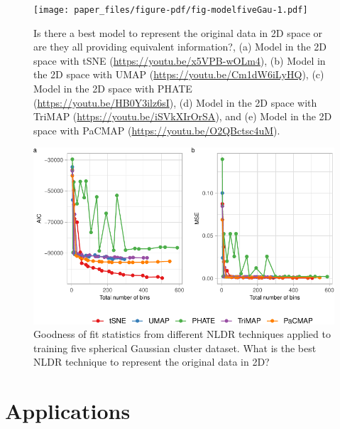 \documentclass[
  12pt]{article}
\begin{document}
\begin{figure}

{\centering \texttt{[image: paper\_files/figure-pdf/fig-modelfiveGau-1.pdf]}

}

\caption{\label{fig-modelfiveGau}Is there a best model to represent the
original data in 2D space or are they all providing equivalent
information?, (a) Model in the 2D space with tSNE
(\url{https://youtu.be/x5VPB-wOLm4}), (b) Model in the 2D space with
UMAP (\url{https://youtu.be/Cm1dW6iLyHQ}), (c) Model in the 2D space
with PHATE (\url{https://youtu.be/HB0Y3ilz6sI}), (d) Model in the 2D
space with TriMAP (\url{https://youtu.be/iSVkXIrOrSA}), and (e) Model in
the 2D space with PaCMAP (\url{https://youtu.be/O2QBctsc4uM}).}

\end{figure}

\begin{figure}

{\centering \includegraphics[width=1\textwidth,height=\textheight]{paper_files/figure-pdf/fig-diagnosticpltGau-1.pdf}

}

\caption{\label{fig-diagnosticpltGau}Goodness of fit statistics from
different NLDR techniques applied to training five spherical Gaussian
cluster dataset. What is the best NLDR technique to represent the
original data in 2D?}

\end{figure}

\hypertarget{sec-applications}{%
\section{Applications}\label{sec-applications}}
\end{document}
